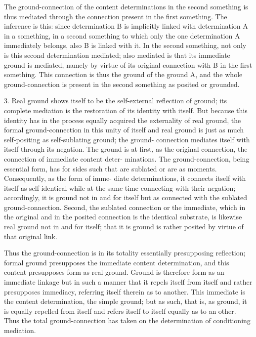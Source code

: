 The ground-connection of the content determinations
in the second something is thus mediated through
the connection present in the first something.
The inference is this:
since determination B is implicitly linked with determination A in a something,
in a second something to which only the one determination A immediately belongs,
also B is linked with it.
In the second something, not only is this second determination mediated;
also mediated is that its immediate ground is mediated,
namely by virtue of its original connection with B in the first something.
This connection is thus the ground of the ground A,
and the whole ground-connection is present in
the second something as posited or grounded.

3. Real ground shows itself to be the self-external reflection of ground;
its complete mediation is the restoration of its identity with itself. But
because this identity has in the process equally acquired the externality of
real ground, the formal ground-connection in this unity of itself and real
ground is just as much self-positing as self-sublating ground; the ground-
connection mediates itself with itself through its negation. The ground is at
first, as the original connection, the connection of immediate content deter-
minations. The ground-connection, being essential form, has for sides such
that are sublated or are as moments. Consequently, as the form of imme-
diate determinations, it connects itself with itself as self-identical while at
the same time connecting with their negation; accordingly, it is ground not
in and for itself but as connected with the sublated ground-connection.
Second, the sublated connection or the immediate, which in the original
and in the posited connection is the identical substrate, is likewise real
ground not in and for itself; that it is ground is rather posited by virtue of
that original link.

Thus the ground-connection is in its totality
essentially presupposing reflection;
formal ground presupposes the immediate content determination,
and this content presupposes form as real ground.
Ground is therefore form as an immediate linkage
but in such a manner that it repels itself from itself
and rather presupposes immediacy,
referring itself therein as to another.
This immediate is the content determination, the simple ground;
but as such, that is, as ground, it is equally repelled from itself
and refers itself to itself equally as to an other.
Thus the total ground-connection has taken on
the determination of conditioning mediation.

